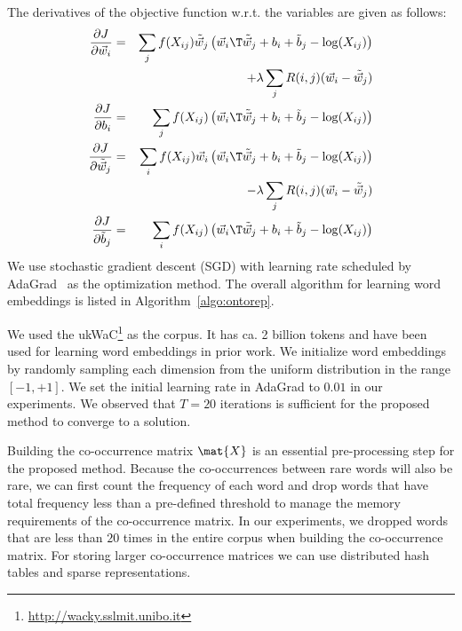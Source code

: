 \documentclass[letterpaper]{article}
\newcommand{\citep}{\cite}
\begin{document}
The derivatives of the objective function w.r.t. the variables are given as follows:
{\small
\begin{align}
\label{eq:part:wi}
\frac{\partial J}{\partial \vec{w}_i} &=&   \sum_j f(X_{ij}) \tilde{\vec{w}}_j \left(\vec{w}_i\T\tilde{\vec{w}}_j +b_i + \tilde{b}_j  - \log(X_{ij}) \right) \nonumber \\
							   & & + \lambda \sum_j R(i,j) (\vec{w}_i - \tilde{\vec{w}}_j)	\\	
\label{eq:part:bi}					   
\frac{\partial J}{\partial b_i} &=&   \sum_j f(X_{ij}) \left(\vec{w}_i\T\tilde{\vec{w}}_j +b_i + \tilde{b}_j  - \log(X_{ij}) \right) 	\\	
\label{eq:part:wj}				   
\frac{\partial J}{\partial \tilde{\vec{w}}_j} &=&  \sum_i f(X_{ij}) \vec{w}_i \left(\vec{w}_i\T\tilde{\vec{w}}_j +b_i + \tilde{b}_j  - \log(X_{ij}) \right) \nonumber \\
 							   & &	- \lambda \sum_j R(i,j) (\vec{w}_i - \tilde{\vec{w}}_j)	\\	
\label{eq:part:bj}					   
\frac{\partial J}{\partial \tilde{b}_j} &=&   \sum_i f(X_{ij}) \left(\vec{w}_i\T\tilde{\vec{w}}_j +b_i + \tilde{b}_j  - \log(X_{ij}) \right) 
\end{align}
}
We use stochastic gradient descent (SGD) with learning rate scheduled by
AdaGrad~\citep{Duchi:JMLR:2011} as the optimization method.
The overall algorithm for learning word embeddings is listed in Algorithm~\ref{algo:ontorep}.


We used the ukWaC\footnote{\url{http://wacky.sslmit.unibo.it}} as the corpus. 
It has ca. 2 billion tokens and have been used for learning word embeddings in prior work.
We initialize word embeddings by randomly sampling each dimension from the uniform distribution in the range $[-1,+1]$.
We set the initial learning rate in AdaGrad to $0.01$ in our experiments. 
We observed that $T = 20$ iterations is sufficient for the proposed method to converge to a solution.

Building the co-occurrence matrix $\mat{X}$ is an essential pre-processing step for the proposed method.
Because the co-occurrences between rare words will also be rare, we can first count the frequency of each word and
drop words that have total frequency less than a pre-defined threshold to manage the memory requirements of the
co-occurrence matrix. In our experiments, we dropped words that are less than $20$ times in the entire corpus
when building the co-occurrence matrix. 
For storing larger co-occurrence matrices we can use distributed hash tables and sparse representations.
\end{document}
